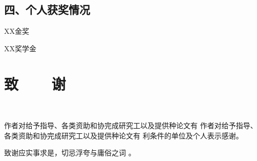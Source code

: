 \vspace{22pt}
\subsection*{四、个人获奖情况}
\begin{enumerate}[label={[\arabic*]},itemindent=2em,wide]
	\item XX金奖
	\item XX奖学金
\end{enumerate}
\fi

\newpage

\ifblindreview
\else

\section{{致~~~~谢}} %
{~}
\vspace{-9pt}

作者对给予指导、各类资助和协完成研究工以及提供种论文有 作者对给予指导、各类资助和协完成研究工以及提供种论文有 利条件的单位及个人表示感谢。

致谢应实事求是，切忌浮夸与庸俗之词 。

\newpage
\fi